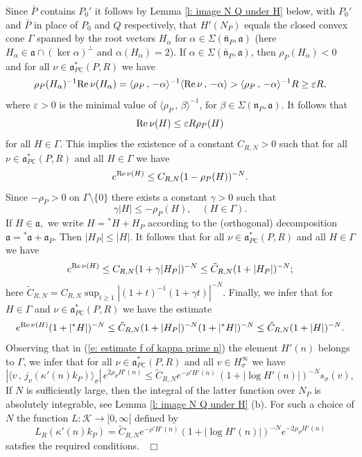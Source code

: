 \documentclass[12pt,a4paper]{article}
\def\qed{~\hfill\hbox{$\Box$}\medbreak}
\def\msy#1{{\mathbb #1}}
\def\C{{\msy C}}
\def\ga{\alpha}
\def\gb{\beta}
\def\ge{\varepsilon}
\def\gg{\gamma}
\def\gs{\sigma}
\def\gS{\Sigma}
\def\got#1{\mathfrak #1}
\def\fa{{\got a}}
\def\fn{{\got n}}
\def\to{\rightarrow}
\def\Re{{\rm Re}\,}
\def\inp#1#2{\langle#1\,,\,#2\rangle}
\def\iC{{\scriptscriptstyle \C}}
\def\cK{{\mathcal K}}
\numberwithin{Thm}{section}
\numberwithin{equation}{section}
\def\faPdc{{\fa_{P\iC}^*}}
\numberwithin{equation}{section}
\def\faPdc{\fa_{P\iC}^*}
\begin{document}
Since $\bar P$ contains $ P_0'$ it follows by 
Lemma \ref{l: image N Q under H} below, with $P_0'$ and $\bar P$ in place of $P_0$ and $Q$ 
respectively,
that $H'(N_P)$ equals the closed convex cone $\Gamma$ spanned by 
the root vectors $H_\ga$ for $\ga \in \gS(\bar \fn_P, \fa)$ (here $H_\ga \in \fa\cap (\ker \ga)^\perp$ 
and $\ga(H_\ga) = 2$). 
If $\ga \in \gS(\bar\fn_P, \fa )$, then $\rho_P(H_\ga) < 0$ 
and for all $\nu \in \faPdc(P, R)$ we have 
$$ 
\rho_P(H_\ga)^{-1} \Re \nu(H_\ga)= \inp{\rho_P}{- \ga}^{-1} \inp{\Re \nu}{ - \ga} >
\inp{\rho_P}{- \ga}^{-1} R \geq \ge R,
$$%
where $\ge > 0$ is the minimal value of $\inp{\rho_P}{\gb}^{-1}$,  for $\gb \in \gS(\fn_P, \fa).$
It follows that
$$
\Re\nu(H) \leq \ge R \rho_P(H)
$$%
for all $H \in \Gamma.$ This implies the existence of a constant $C_{R,N}> 0$ such that 
for all $\nu \in \faPdc(P,R)$ and all $H \in\Gamma$ we have
$$ 
e^{\Re \nu(H)} \leq C_{R,N} ( 1 - \rho_P(H))^{-N}.
$$%
Since $-\rho_P > 0$ on $\Gamma\setminus \{0\}$ there exists a constant $\gg > 0$ such that
$$
\gg |H| \leq -\rho_P(H), \quad (H\in \Gamma).
$$%
If $H\in \fa,$ we write $H = {}^* H + H_{ P}$ according to the (orthogonal) decomposition
$\fa = {}^*\fa + \fa_P.$ Then $|H_P|\leq |H|. $ It follows that for all $\nu \in \faPdc(P,R)$ and all $H \in\Gamma$
we have
$$ 
e^{\Re \nu(H)} \leq C_{R,N} ( 1 + \gg |H_P|)^{-N} \leq \tilde C_{R,N}( 1+ |H_P|)^{-N};
$$%
here $\tilde C_{R,N} = C_{R,N}\sup_{t\geq1} |(1 + t)^{-1}(1 + \gg t)|^{-N}.$
Finally, we infer that for $H \in \Gamma$ and $\nu \in \faPdc(P, R)$ we have the estimate 
$$ 
e^{\Re \nu (H)}(1 + |{}^* H|)^{-N} 
 \leq \tilde C_{R,N} (1 + |H_P|)^{-N} (1 + |{}^* H|)^{-N}  \leq \tilde C_{R,N} ( 1 + |H|)^{-N}.
$$%
 Observing that in (\ref{e: estimate f of kappa prime n}) the element $H'(n)$ belongs to $\Gamma$, we infer that for all $\nu \in \faPdc(P, R)$ and all $v \in H_\gs^\infty$ we have 
\begin{equation}
\label{e: first estimate j}
| \inp{v}{j_\nu(\kappa'(n) k_P)}_\gs|  \,e^{2 \rho_P  H'(n)} 
\leq 
\tilde C_{R,N} e^{-\rho' H'(n)} \,(1 + |\log H'(n)|)^{-N} s_\gs (v),
\end{equation}
If $N$ is sufficiently large, then the integral of the latter function
over $N_P$ is absolutely integrable, see Lemma \ref{l: image N Q under H} (b).
For such a choice of $N$ 
the function $L: \cK \to [0,\infty[$ defined by 
\begin{equation}
\label{e: defi L R}
L_R(\kappa'(n) k_P) = \tilde C_{R,N} e^{- \rho' H'(n)} (1 + |\log H'(n)|)^{-N} e^{- 2 \rho_P  H'(n)}
\end{equation} 
satsfies the required conditions.
\qed
\end{document}
